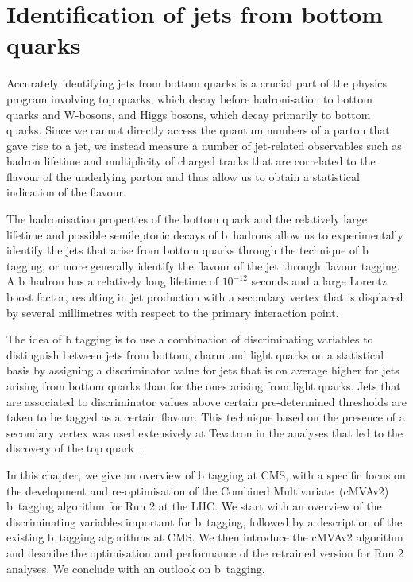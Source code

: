 \chapter{Identification of jets from bottom quarks}
\label{sec:btagging}
Accurately identifying jets from bottom quarks is a crucial part of the physics program involving top quarks, which decay before hadronisation to bottom quarks and W-bosons, and Higgs bosons, which decay primarily to bottom quarks. Since we cannot directly access the quantum numbers of a parton that gave rise to a jet, we instead measure a number of jet-related observables such as hadron lifetime and multiplicity of charged tracks that are correlated to the flavour of the underlying parton and thus allow us to obtain a statistical indication of the flavour.

The hadronisation properties of the bottom quark and the relatively large lifetime and possible semileptonic decays of b~hadrons allow us to experimentally identify the jets that arise from bottom quarks through the technique of b tagging, or more generally identify the flavour of the jet through flavour tagging. A b~hadron has a relatively long lifetime of $10^{-12}$ seconds and a large Lorentz boost factor, resulting in jet production with a secondary vertex that is displaced by several millimetres with respect to the primary interaction point.

The idea of b tagging is to use a combination of discriminating variables to distinguish between jets from bottom, charm and light quarks on a statistical basis by assigning a discriminator value for jets that is on average higher for jets arising from bottom quarks than for the ones arising from light quarks. Jets that are associated to discriminator values above certain pre-determined thresholds are taken to be tagged as a certain flavour. This technique based on the presence of a secondary vertex was used extensively at Tevatron in the analyses that led to the discovery of the top quark~\cite{Abe:1994st,Abe:1995hr}.

In this chapter, we give an overview of b tagging at CMS, with a specific focus on the development and re-optimisation of the Combined Multivariate~(cMVAv2) b~tagging algorithm for Run 2 at the LHC. We start with an overview of the discriminating variables important for b~tagging, followed by a description of the existing b~tagging algorithms at CMS. We then introduce the cMVAv2 algorithm and describe the optimisation and performance of the retrained version for Run 2 analyses. We conclude with an outlook on b~tagging. 

